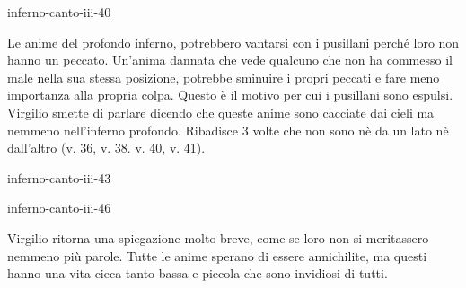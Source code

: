 \documentclass[preview]{standalone}
\begin{document}
\begin{snippet}{inferno-canto-iii-40}
    
    Le anime del profondo inferno, potrebbero vantarsi con i pusillani perché loro non hanno un peccato.
    Un'anima dannata che vede qualcuno che non ha commesso il male nella sua stessa posizione,
    potrebbe sminuire i propri peccati e fare meno importanza alla propria colpa.
    Questo è il motivo per cui i pusillani sono espulsi.
    \\
    Virgilio smette di parlare dicendo che queste anime sono cacciate dai cieli
    ma nemmeno nell'inferno profondo. Ribadisce 3 volte che non sono nè da un lato nè dall'altro
    (v. 36, v. 38. v. 40, v. 41).
\end{snippet}

\begin{snippet}{inferno-canto-iii-43}
\end{snippet}

\begin{snippet}{inferno-canto-iii-46}
    


    Virgilio ritorna una spiegazione molto breve, come se loro non si meritassero nemmeno
    più parole. Tutte le anime sperano di essere annichilite, ma questi
    hanno una vita cieca tanto bassa e piccola che sono invidiosi di tutti.
\end{snippet}
\end{document}
